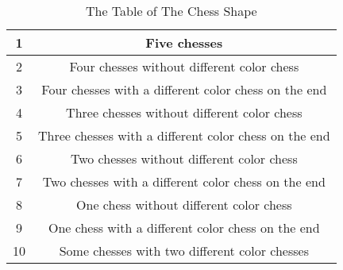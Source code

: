 \documentclass[conference,compsoc]{IEEEtran}
\begin{document}
  \begin{table}[!htbp]
    \centering
    \caption{The Table of The Chess Shape}\label{tab:aStrangeTable}
    \begin{tabular}{|c|c|}
      \hline
      1 & Five chesses\\
      \hline
      2 & Four chesses without different color chess\\
      \hline
      3 & Four chesses with a different color chess on the end\\
      \hline
      4 & Three chesses without different color chess\\
      \hline
      5 & Three chesses with a different color chess on the end\\
      \hline
      6 & Two chesses without different color chess\\
      \hline
      7 & Two chesses with a different color chess on the end\\
      \hline
      8 & One chess without different color chess\\
      \hline
      9 & One chess with a different color chess on the end\\
      \hline
      10 & Some chesses with two different color chesses\\
      \hline
    \end{tabular}
  \end{table}
\end{document}
